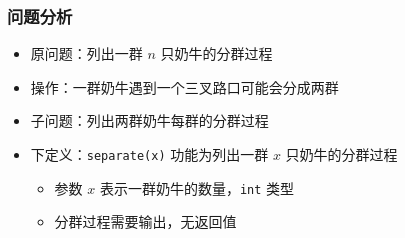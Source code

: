 \begin{frame}[fragile]
    \frametitle{问题分析}

    \begin{itemize}
        \item 原问题：列出一群 $n$ 只奶牛的分群过程
        \item 操作：一群奶牛遇到一个三叉路口可能会分成两群
        \item 子问题：列出两群奶牛每群的分群过程
        \item 下定义：\lstinline|separate(x)| 功能为列出一群 $x$ 只奶牛的分群过程
            \begin{itemize}
                \item 参数 $x$ 表示一群奶牛的数量，\lstinline|int| 类型
                \item 分群过程需要输出，无返回值
            \end{itemize}
    \end{itemize}

\end{frame}

